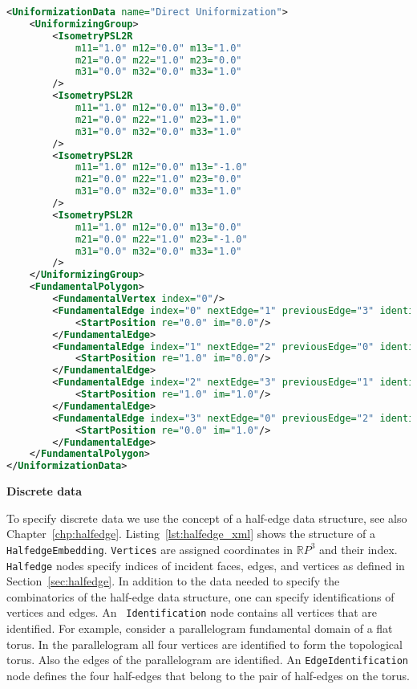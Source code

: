 \documentclass[Thesis.tex]{subfiles}
\begin{document}
\begin{lstlisting}[label=lst:fuchsian_xml, caption={A torus given by its Fuchsian uniformizing group and a corresponding fundamental polygon. The elements of the group are either euclidean motions or hyperbolic motions given as elements of $PSL(2, \mathbb R)$.}, numbers=none, language=XML, captionpos=b]
<UniformizationData name="Direct Uniformization">
	<UniformizingGroup>
		<IsometryPSL2R 
			m11="1.0" m12="0.0" m13="1.0" 
			m21="0.0" m22="1.0" m23="0.0" 
			m31="0.0" m32="0.0" m33="1.0"
		/>
		<IsometryPSL2R 
			m11="1.0" m12="0.0" m13="0.0" 
			m21="0.0" m22="1.0" m23="1.0" 
			m31="0.0" m32="0.0" m33="1.0"
		/>
		<IsometryPSL2R 
			m11="1.0" m12="0.0" m13="-1.0" 
			m21="0.0" m22="1.0" m23="0.0" 
			m31="0.0" m32="0.0" m33="1.0"
		/>
		<IsometryPSL2R 
			m11="1.0" m12="0.0" m13="0.0" 
			m21="0.0" m22="1.0" m23="-1.0" 
			m31="0.0" m32="0.0" m33="1.0"
		/>
	</UniformizingGroup>
	<FundamentalPolygon>
		<FundamentalVertex index="0"/>
		<FundamentalEdge index="0" nextEdge="1" previousEdge="3" identifiedEdge="2" startVertex="0">
			<StartPosition re="0.0" im="0.0"/>
		</FundamentalEdge>
		<FundamentalEdge index="1" nextEdge="2" previousEdge="0" identifiedEdge="3" startVertex="0">
			<StartPosition re="1.0" im="0.0"/>
		</FundamentalEdge>
		<FundamentalEdge index="2" nextEdge="3" previousEdge="1" identifiedEdge="0" startVertex="0">
			<StartPosition re="1.0" im="1.0"/>
		</FundamentalEdge>
		<FundamentalEdge index="3" nextEdge="0" previousEdge="2" identifiedEdge="1" startVertex="0">
			<StartPosition re="0.0" im="1.0"/>
		</FundamentalEdge>
	</FundamentalPolygon>
</UniformizationData>
\end{lstlisting}

{\bf Discrete data} 

To specify discrete data we use the concept of a half-edge data structure, see
also Chapter~\ref{chp:halfedge}. Listing~\ref{lst:halfedge_xml} shows the
structure of a {\tt HalfedgeEmbedding}. {\tt Vertices} are assigned coordinates
in $\mathbb RP^3$ and their index. {\tt Halfedge} nodes specify indices of
incident faces, edges, and vertices as defined in Section~\ref{sec:halfedge}.
In addition to the data needed to specify the combinatorics of the half-edge
data structure, one can specify identifications of vertices and edges. An {\tt
Identification} node contains all vertices that are identified. For example, consider a
parallelogram fundamental domain of a flat torus. In the parallelogram all four
vertices are identified to form the topological torus. Also the edges of the
parallelogram are identified. An {\tt EdgeIdentification} node defines the four
half-edges that belong to the pair of half-edges on the torus.
\end{document}
